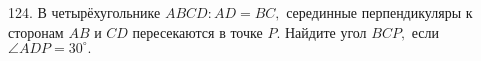 124. В четырёхугольнике $ABCD: AD=BC,$ серединные перпендикуляры к сторонам $AB$ и $CD$ пересекаются в точке $P.$ Найдите угол $BCP,$ если $\angle ADP=30^\circ.$\\
